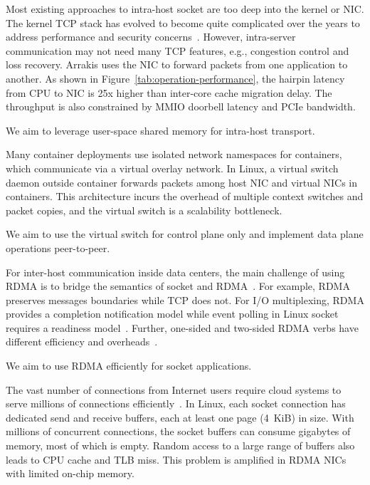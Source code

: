 Most existing approaches to intra-host socket are too deep into the kernel or NIC.
The kernel TCP stack has evolved to become quite complicated over the years to address performance and security concerns~\cite{yasukata2016stackmap}.
However, intra-server communication may not need many TCP features, e.g., congestion control and loss recovery.
Arrakis uses the NIC to forward packets from one application to another.
As shown in Figure~\ref{tab:operation-performance}, the hairpin latency from CPU to NIC is 25x higher than inter-core cache migration delay.
The throughput is also constrained by MMIO doorbell latency and PCIe bandwidth.

We aim to leverage user-space shared memory for intra-host transport.

Many container deployments use isolated network namespaces for containers, which communicate via a virtual overlay network.
In Linux, a virtual switch daemon outside container forwards packets among host NIC and virtual NICs in containers.
This architecture incurs the overhead of multiple context switches and packet copies, and the virtual switch is a scalability bottleneck.

We aim to use the virtual switch for control plane only and implement data plane operations peer-to-peer.

For inter-host communication inside data centers, the main challenge of using RDMA is to bridge the semantics of socket and RDMA~\cite{dragojevic2014farm}.
For example, RDMA preserves messages boundaries while TCP does not.
For I/O multiplexing, RDMA provides a completion notification model while event polling in Linux socket requires a readiness model~\cite{han2012megapipe}.
Further, one-sided and two-sided RDMA verbs have different efficiency and overheads~\cite{kalia2014using,kaminsky2016design}.

We aim to use RDMA efficiently for socket applications.

The vast number of connections from Internet users require cloud systems to serve millions of connections efficiently~\cite{nishtala2013scaling,lin2016scalable,belay2017ix}.
In Linux, each socket connection has dedicated send and receive buffers, each at least one page (4~KiB) in size. With millions of concurrent connections, the socket buffers can consume gigabytes of memory, most of which is empty.
Random access to a large range of buffers also leads to CPU cache and TLB miss.
This problem is amplified in RDMA NICs with limited on-chip memory.

